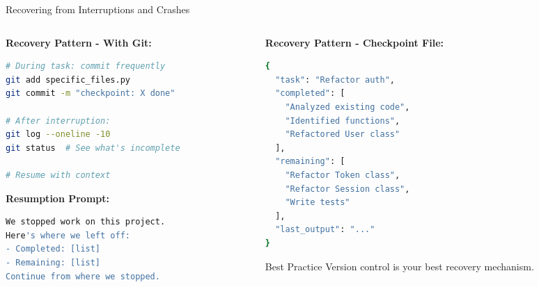 \documentclass[aspectratio=169,11pt]{beamer}
\begin{document}
\begin{frame}[fragile]{Recovering from Interruptions and Crashes}
    \begin{columns}[T]
        \begin{column}{0.48\textwidth}
            \textbf{Recovery Pattern - With Git:}
            \begin{lstlisting}[language=Bash]
# During task: commit frequently
git add specific_files.py
git commit -m "checkpoint: X done"

# After interruption:
git log --oneline -10
git status  # See what's incomplete

# Resume with context
            \end{lstlisting}

            \vspace{0.2cm}
            \textbf{Resumption Prompt:}
            \begin{lstlisting}[language=Bash]
We stopped work on this project.
Here's where we left off:
- Completed: [list]
- Remaining: [list]
Continue from where we stopped.
            \end{lstlisting}
        \end{column}
        \begin{column}{0.48\textwidth}
            \textbf{Recovery Pattern - Checkpoint File:}
            \begin{lstlisting}[language=Bash]
{
  "task": "Refactor auth",
  "completed": [
    "Analyzed existing code",
    "Identified functions",
    "Refactored User class"
  ],
  "remaining": [
    "Refactor Token class",
    "Refactor Session class",
    "Write tests"
  ],
  "last_output": "..."
}
            \end{lstlisting}

            \begin{alertblock}{Best Practice}
                Version control is your best recovery mechanism.
            \end{alertblock}
        \end{column}
    \end{columns}
\end{frame}
\end{document}

